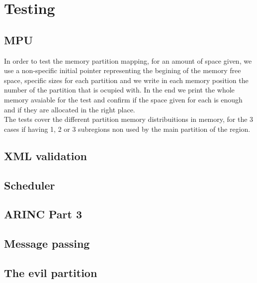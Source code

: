 \chapter{Testing}

\section{MPU}
In order to test the memory partition mapping, for an amount of space given, we use a non-specific initial
 pointer representing the begining of the memory free space, specific sizes for each partition and we
  write in each memory position the number of the partition that is ocupied with. In the end we print the
   whole memory avaiable for the test and confirm if the space given for each is enough and if they are
    allocated in the right place.\\
 The tests cover the different partition memory distribuitions in memory, for the 3 cases if having 1, 2 or
  3 subregions non used by the main partition of the region.

\section{XML validation}

\section{Scheduler}

\section{ARINC Part 3}

\section{Message passing}

\section{The evil partition}